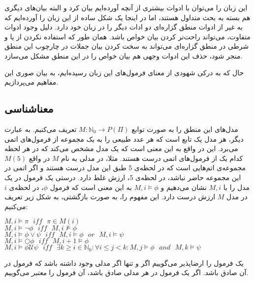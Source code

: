 این زبان را می‌توان با ادوات بیشتری از آنچه آورده‌ایم بیان کرد و البته بیان‌های دیگری هم بسته به بحث متداول هستند، اما در اینجا یک شکل ساده از این زبان را آورده‌ایم که به غیر از ادوات منطق گزاره‌ای دو ادات دیگر را در زبان خود دارد. دلیل وجود ادوات متفاوت، می‌تواند راحت‌تر کردن بیان خواص باشد. همان طور که استفاده نکردن از یا و شرطی در منطق گزاره‌ای می‌تواند به سخت کردن بیان جملات در چارچوب این منطق منجر شود، حذف این ادوات وجهی هم بیان خواص را در این منطق مشکل می‌سازد. 

حال که به درکی شهودی از معنای فرمول‌های این زبان رسیده‌ایم، به بیان صوری این مفاهیم می‌پردازیم.

\subsection{معناشناسی }

مدل‌های این منطق را به صورت توابع
$M:\mathbb{N}_0 \rightarrow \mathit{P}(\Pi)$ 
تعریف می‌کنیم. به عبارت دیگر، هر مدل یک تابع است که هر عدد طبیعی را به یک مجموعه از فرمول‌های اتمی می‌برد. این در واقع به این معنی است که یک مدل مشخص می‌کند که در هر لحظه کدام یک از فرمول‌های اتمی درست هستند. مثلا، در مدلی به نام $M$ در واقع
$M(5)$
مجموعه‌ی اتم‌هایی است که در لحظه‌ی 5 طبق این مدل درست هستند و اگر اتمی در این مجموعه حاضر نباشد، در لحظه‌ی 5، ارزش غلط دارد.
درستی یک فرمول در یک مدل را با 
$M,i$
نشان می‌دهیم و 
$M,i \models \phi$
به این معنی است که فرمول $\phi$، در لحظه‌ی $i$در مدل $M$ ارزش درست دارد. این مفهوم را، به صورت بازگشتی، به شکل زیر تعریف می‌کنیم:


\begin{flushleft}
$	M,i \models \pi \:\:\: \mathit{iff} \:\:\: \pi \in M(i)$\\
$	M,i \models \neg \phi \:\:\: \mathit{iff} \:\:\: M,i\nvDash \phi$\\
$	M,i \models \phi \lor \psi \:\:\: \mathit{iff} \:\:\: M,i \models \phi \:\:\: \mathit{or} \:\:\: M,i \models \psi$\\
	 $M,i \models \bigcirc \phi  \:\:\:  \mathit{iff} \:\:\: M,i+1 \models \phi$\\
	 $M,i \models \phi \mathcal{U} \psi \:\:\: \mathit{iff} \:\:\: 
	 \exists k \geq i \in \mathbb{N}_0: \forall i\leq j< k: M,j \models \phi \:\:\: \mathit{and} \:\:\: M,k \models \psi$
\end{flushleft}


یک فرمول را ارضاپذیر می‌گوییم اگر و تنها اگر مدلی وجود داشته باشد که فرمول در آن صادق باشد.
اگر یک فرمول در هر مدلی صادق باشد، آن فرمول را \emph{معتبر} می‌گوییم.\\


